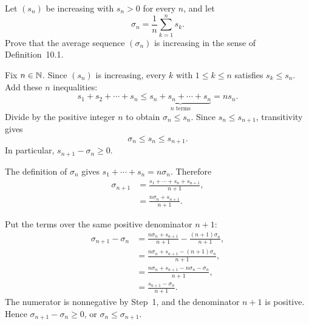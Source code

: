 
\goal Let $(s_n)$ be increasing with $s_n>0$ for every $n$, and let
\[
 \sigma_n=\frac1n\sum_{k=1}^{n}s_k.
\]
Prove that the average sequence $(\sigma_n)$ is increasing in the
sense of Definition~10.1.

Fix $n\in\mathbb{N}$. Since $(s_n)$ is increasing, every $k$ with $1\le k\le n$
satisfies $s_k\le s_n$. Add these $n$ inequalities:
\[
 s_1+s_2+\cdots+s_n\le
 \underbrace{s_n+s_n+\cdots+s_n}_{n\text{ terms}}=ns_n.
\]
Divide by the positive integer $n$ to obtain $\sigma_n\le s_n$.
Since $s_n\le s_{n+1}$, transitivity gives
\[
 \sigma_n\le s_n\le s_{n+1}.
\]
In particular, $s_{n+1}-\sigma_n\ge0$.

The definition of $\sigma_n$ gives
$s_1+\cdots+s_n=n\sigma_n$. Therefore
\begin{align*}
 \sigma_{n+1}
   &=\frac{s_1+\cdots+s_n+s_{n+1}}{n+1},\\
   &=\frac{n\sigma_n+s_{n+1}}{n+1}.
\end{align*}

Put the terms over the same positive denominator $n+1$:
\begin{align*}
 \sigma_{n+1}-\sigma_n
   &=\frac{n\sigma_n+s_{n+1}}{n+1}
       -\frac{(n+1)\sigma_n}{n+1},\\
   &=\frac{n\sigma_n+s_{n+1}-(n+1)\sigma_n}{n+1},\\
   &=\frac{n\sigma_n+s_{n+1}-n\sigma_n-\sigma_n}{n+1},\\
   &=\frac{s_{n+1}-\sigma_n}{n+1}.
\end{align*}
The numerator is nonnegative by Step~1, and the denominator $n+1$
is positive. Hence $\sigma_{n+1}-\sigma_n\ge0$, or
$\sigma_n\le\sigma_{n+1}$.

